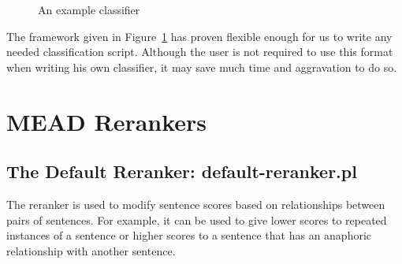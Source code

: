 \documentclass[10pt]{article}
\begin{document}
\begin{figure}[htp!]
\centering
\scriptsize
{}
\caption{An example classifier}
\label{figure:classifier-example}
\end{figure}

The framework given in Figure~\ref{figure:classifier-example}
has proven flexible enough for us to write any needed 
classification script.  Although the user is not required to
use this format when writing his own classifier, it may save
much time and aggravation to do so.





\section{MEAD Rerankers}

\subsection{The Default Reranker: default-reranker.pl}

The reranker is used to modify sentence scores based on
relationships between pairs of sentences. For example, it can be used
to give lower scores to repeated instances of a sentence or 
higher scores to a sentence that has an anaphoric relationship 
with another sentence.
\end{document}
